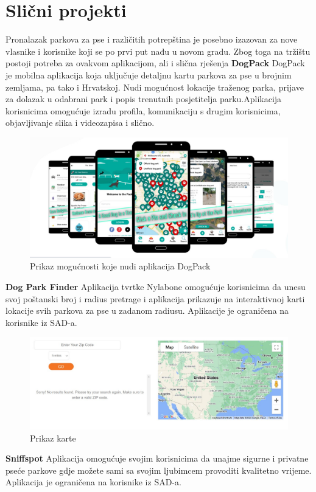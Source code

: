     \section{Slični projekti}
    Pronalazak parkova za pse i različitih potrepština je posebno izazovan za nove vlasnike i korisnike koji se po prvi put nađu u novom gradu. Zbog toga na tržištu postoji potreba za ovakvom aplikacijom, ali i slična rješenja
    \newline
    \textbf{DogPack} \newline
    DogPack je mobilna aplikacija koja uključuje detaljnu kartu parkova za pse u brojnim zemljama, pa tako i Hrvatskoj. Nudi mogućnost lokacije traženog parka, prijave za dolazak u odabrani park i popis trenutnih posjetitelja parku.Aplikacija korisnicima omogućuje izradu profila, komunikaciju s drugim korisnicima, objavljivanje slika i videozapisa i slično.  
    \begin{figure}[H]
        \centering
        \includegraphics[width=\textwidth]{img/DogPack.jpg}
        \caption{Prikaz mogućnosti koje nudi aplikacija DogPack}
    \end{figure}
    
    
    \textbf{Dog Park Finder} \newline
    Aplikacija tvrtke Nylabone omogućuje korisnicima da unesu svoj poštanski broj i radius pretrage i aplikacija prikazuje na interaktivnoj karti lokacije svih parkova za pse u zadanom radiusu. Aplikacije je ograničena na korisnike iz SAD-a. 
    \begin{figure}[H]
        \centering
        \includegraphics[width=\textwidth]{img/DogParkFinder.jpg}
        \caption{Prikaz karte}
    \end{figure}
    \textbf{Sniffspot} \newline
    Aplikacija omogućuje svojim korisnicima da unajme sigurne i privatne pseće parkove gdje možete sami sa svojim ljubimcem provoditi kvalitetno vrijeme. Aplikacija je ograničena na korisnike iz SAD-a.
    
	
		
		
		